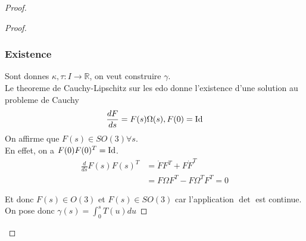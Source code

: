 \documentclass[../main.tex]{subfiles}
\begin{document}
\begin{proof}
\begin{proof}
\subsubsection*{Existence}
Sont donnes $\kappa, \tau: I \to \mathbb{R}$, on veut construire $\gamma$.\\
Le theoreme de Cauchy-Lipschitz sur les edo donne l'existence d'une solution au probleme de Cauchy
\[ 
	\frac{dF}{ds}= F( s) \Omega( s) , F( 0) =\operatorname{Id}
\]
On affirme que $F( s) \in SO( 3) \forall s$.\\
En effet, on a $F( 0) F( 0) ^{T}= \operatorname{Id}$.\\
\begin{align*}
	\frac{d}{ds}F( s) F( s) ^{T}&= \dot F F^{T}+ F \dot F^{T}\\
				    &= F\Omega F^{T}- F\Omega^{T}F^{T}=0
\end{align*}

Et donc $F( s)\in O( 3)  $ et $F( s)\in SO( 3)  $ car l'application $\det$ est continue.\\
On pose donc $\gamma( s) = \int_{ 0 }^{ s }T( u) du$ 


\end{proof}

	
	




\end{proof}
\end{document}
